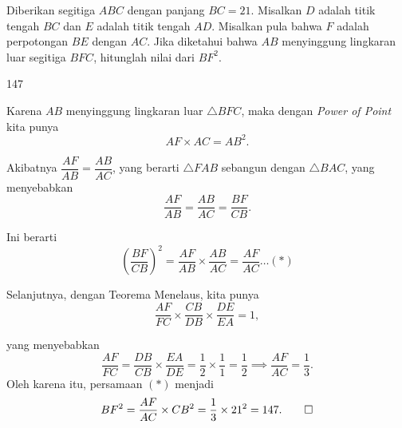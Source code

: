 \documentclass[11pt]{scrartcl}
\begin{document}
	\begin{soaljawab}
		Diberikan segitiga $ABC$ dengan panjang $BC = 21$. Misalkan $D $ adalah titik tengah
		$BC $ dan $E $ adalah titik tengah $AD$. Misalkan pula bahwa $F $ adalah perpotongan $BE$
		dengan $AC$. Jika diketahui bahwa $AB $ menyinggung lingkaran luar segitiga $BFC$,
		hitunglah nilai dari $BF^2$.
		
		\begin{jawaban}
		147
		\end{jawaban}
		\begin{solusi}
		Karena $AB$ menyinggung lingkaran luar $\triangle BFC$, maka dengan \textit{Power of Point} kita punya 
        $$AF \times AC = AB^2.$$ 
        
        Akibatnya $\dfrac{AF}{AB}=\dfrac{AB}{AC}$, yang berarti $\triangle FAB$ sebangun dengan $\triangle BAC$, yang menyebabkan 
        $$\dfrac{AF}{AB}=\dfrac{AB}{AC}=\dfrac{BF}{CB}.$$ 
        
        Ini berarti $$\left(\dfrac{BF}{CB}\right)^2=\dfrac{AF}{AB}\times\dfrac{AB}{AC}=\dfrac{AF}{AC}\dots(*)$$ 
        
        Selanjutnya, dengan Teorema Menelaus, kita punya $$\dfrac{AF}{FC}\times\dfrac{CB}{DB}\times\dfrac{DE}{EA}=1,$$ 
        
        yang menyebabkan 
        $$\dfrac{AF}{FC}=\dfrac{DB}{CB}\times\dfrac{EA}{DE}=\dfrac{1}{2}\times\dfrac{1}{1}=\dfrac{1}{2} \implies \dfrac{AF}{AC} = \dfrac{1}{3}.$$ Oleh karena itu, persamaan $(*)$ menjadi $$BF^2=\dfrac{AF}{AC}\times CB^2=\dfrac{1}{3}\times 21^2=147.\qed $$ 
		\end{solusi}
	\end{soaljawab}
\end{document}

